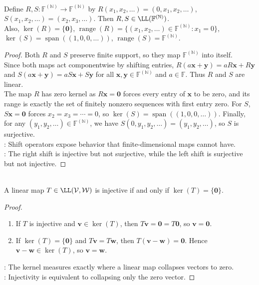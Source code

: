 \begin{proposition} \label{prop:shift-operators-finitely-nonzero} \\
Define $R,S:\mathbb{F}^{(\mathbb{N})}\to\mathbb{F}^{(\mathbb{N})}$ by $R(x_1,x_2,\ldots)=(0,x_1,x_2,\ldots)$, $S(x_1,x_2,\ldots)=(x_2,x_3,\ldots)$. Then $R,S\in\LL(\mathbb{F}^{(\mathbb{N})})$.\\
Also, $\ker(R)=\{\mathbf{0}\}$, $\operatorname{range}(R)=\{(x_1,x_2,\ldots)\in\mathbb{F}^{(\mathbb{N})}:x_1=0\}$, $\ker(S)=\operatorname{span}((1,0,0,\ldots))$, $\operatorname{range}(S)=\mathbb{F}^{(\mathbb{N})}$.
\begin{proof}
Both $R$ and $S$ preserve finite support, so they map $\mathbb{F}^{(\mathbb{N})}$ into itself.\\
Since both maps act componentwise by shifting entries, $R(a\mathbf{x}+\mathbf{y})=aR\mathbf{x}+R\mathbf{y}$ and $S(a\mathbf{x}+\mathbf{y})=aS\mathbf{x}+S\mathbf{y}$ for all $\mathbf{x},\mathbf{y}\in\mathbb{F}^{(\mathbb{N})}$ and $a\in\mathbb{F}$. Thus $R$ and $S$ are linear.\\
The map $R$ has zero kernel as $R\mathbf{x}=\mathbf{0}$ forces every entry of $\mathbf{x}$ to be zero, and its range is exactly the set of finitely nonzero sequences with first entry zero. For $S$, $S\mathbf{x}=\mathbf{0}$ forces $x_2=x_3=\cdots=0$, so $\ker(S)=\operatorname{span}((1,0,0,\ldots))$. Finally, for any $(y_1,y_2,\ldots)\in\mathbb{F}^{(\mathbb{N})}$, we have $S(0,y_1,y_2,\ldots)=(y_1,y_2,\ldots)$, so $S$ is surjective.\\
: Shift operators expose behavior that finite-dimensional maps cannot have.\\
: The right shift is injective but not surjective, while the left shift is surjective but not injective.
\end{proof}
\end{proposition}

\begin{proposition} \label{prop:injective-iff-kernel-zero} \\
A linear map $T \in \LL(\mathcal{V}, \mathcal{W})$ is injective if and only if $\ker(T) = \{ \mathbf{0} \}$.
\begin{proof}
\begin{enumerate}[label=\roman*.]
\setlength{\itemsep}{0pt}
\item[$(\Rightarrow)$] If $T$ is injective and $\mathbf{v}\in\ker(T)$, then $T\mathbf{v}=\mathbf{0}=T\mathbf{0}$, so $\mathbf{v}=\mathbf{0}$.
\item[$(\Leftarrow)$] If $\ker(T)=\{\mathbf{0}\}$ and $T\mathbf{v}=T\mathbf{w}$, then $T(\mathbf{v}-\mathbf{w})=\mathbf{0}$. Hence $\mathbf{v}-\mathbf{w}\in\ker(T)$, so $\mathbf{v}=\mathbf{w}$.
\end{enumerate}
: The kernel measures exactly where a linear map collapses vectors to zero.\\
: Injectivity is equivalent to collapsing only the zero vector.
\end{proof}
\end{proposition}

